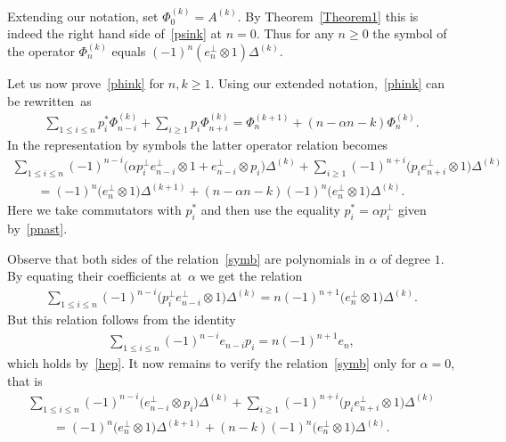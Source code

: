 \documentclass[pdftex]{sigma}
\numberwithin{equation}{section}
\renewcommand\ge{\geqslant}
\renewcommand\le{\leqslant}
\begin{document}
Extending our notation, set $\Phi^{(k)}_0=A^{(k)}$.
By Theorem~\ref{Theorem1} this is indeed the right hand side of~\eqref{psink} at $n=0$.
Thus for any $n\ge0$ the symbol of the operator $\Phi^{(k)}_n$ equals $(-1)^{
n}(e_n^{\perp}\otimes1)\Delta^{(k)}$.

Let us now prove~\eqref{phink} for $n,k\ge1$.
Using our extended notation,~\eqref{phink} can be rewritten~as
\begin{gather*}
\sum_{1\le i\le n}p^{\ast}_i\Phi_{n-i}^{(k)}+\sum_{i\ge1}
p_i\Phi_{n+i}^{(k)}=\Phi^{(k+1)}_n+(
n-\alpha n-k)\Phi_n^{(k)}.
\end{gather*}
In the representation by symbols the latter operator relation becomes
\begin{gather}
\sum_{1\le i\le n}(-1)^{n-i}\big(\alpha p^{\perp}_i e_{n-i}^{\perp}\otimes1+e_{n-i}^{\perp}\otimes p_i\big)\Delta^{(k)}
+\sum_{i\ge1}(-1)^{n+i}\big(p_ie_{n+i}^{\perp}\otimes1\big)\Delta^{(k)}
\nonumber
\\
\qquad {}
=(-1)^{n}\big(e_n^{\perp}\otimes1\big)\Delta^{(k+1)}+(n-\alpha n-k)(-1)^{n}\big(e_n^{\perp}\otimes1\big)\Delta^{(k)}.
\label{symb}
\end{gather}
Here we take commutators with $p^{\ast}_i$ and then use the equality
$p^{\ast}_i=\alpha p^{\perp}_i$ given by~\eqref{pnast}.

Observe that both sides of the relation~\eqref{symb} are polynomials in $\alpha$ of degree
$1$.
By equating their coef\/f\/icients at~$\alpha$ we get the relation
\begin{gather*}
\sum_{1\le i\le n}(-1)^{n-i}\big(p^{\perp}_i e_{n-i}
^{\perp}\otimes1\big)\Delta^{(k)}=n(-1)^{n+1}
\big(e_n^{\perp}\otimes1\big)\Delta^{(k)}.
\end{gather*}
But this relation follows from the identity
\begin{gather*}
\sum_{1\le i\le n}(-1)^{n-i}e_{n-i}p_i=n(-1)^{n+1}e_n,
\end{gather*}
which holds by~\eqref{hep}.
It now remains to verify the relation~\eqref{symb} only for $\alpha=0$, that is
\begin{gather}
\sum_{1\le i\le n}(-1)^{n-i}\big(e_{n-i}^{\perp}
\otimes p_i\big)\Delta^{(k)}+\sum_{i\ge1}(-1)^{n+i}
\big(p_ie_{n+i}^{\perp}\otimes1\big)\Delta^{(k)}
\nonumber
\\
\qquad{}
=(-1)^{n}\big(e_n^{\perp}\otimes1\big)\Delta^{(k+1)}+(
n-k)(-1)^{n}\big(e_n^{\perp}\otimes1\big)\Delta^{(k)}.
\label{symbzero}
\end{gather}
\end{document}
